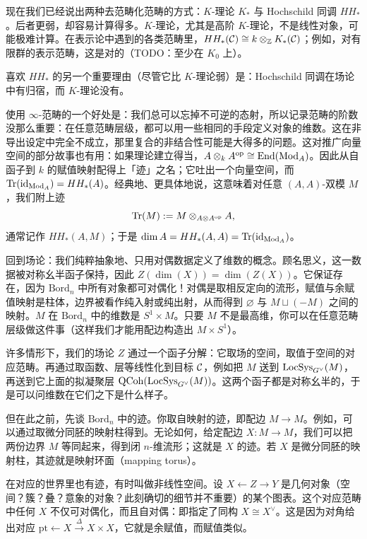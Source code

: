 
现在我们已经说出两种去范畴化范畴的方式：$K$-理论 $K_*$ 与 Hochschild 同调 $HH_*$。后者更弱，却容易计算得多。$K$-理论，尤其是高阶 $K$-理论，不是线性对象，可能极难计算。在表示论中遇到的各类范畴里，$HH_*(\mathcal{C})\cong k\otimes_{\mathbb{Z}} K_*(\mathcal{C})$；例如，对有限群的表示范畴，这是对的（TODO：至少在 $K_0$ 上）。

喜欢 $HH_*$ 的另一个重要理由（尽管它比 $K$-理论弱）是：Hochschild 同调在场论中有归宿，而 $K$-理论没有。

使用 $\infty$-范畴的一个好处是：我们总可以忘掉不可逆的态射，所以记录范畴的阶数没那么重要：在任意范畴层级，都可以用一些相同的手段定义对象的维数。这在非导出设定中完全不成立，那里复合的非结合性可能是大得多的问题。这对推广向量空间的部分故事也有用：如果理论建立得当，$A\otimes_k A^{\mathrm{op}}\cong\operatorname{End}(\mathrm{Mod}_A)$。因此从自函子到 $k$ 的赋值映射配得上「迹」之名；它吐出一个向量空间，而 $\operatorname{Tr}(\operatorname{id}_{\mathrm{Mod}_A})=HH_*(A)$。经典地、更具体地说，这意味着对任意 $(A,A)$-双模 $M$，我们附上迹
\[
\operatorname{Tr}(M):=M\otimes_{A\otimes A^{\mathrm{op}}}A,
\]
通常记作 $HH_*(A,M)$；于是 $\dim A=HH_*(A,A)=\operatorname{Tr}(\operatorname{id}_{\mathrm{Mod}_A})$。

回到场论：我们纯粹抽象地、只用对偶数据定义了维数的概念。顾名思义，这一数据被对称幺半函子保持，因此 $Z(\dim(X))=\dim(Z(X))$。它保证存在，因为 $\mathrm{Bord}_n$ 中所有对象都可对偶化！对偶是取相反定向的流形，赋值与余赋值映射是柱体，边界被看作纯入射或纯出射，从而得到 $\varnothing$ 与 $M\sqcup(-M)$ 之间的映射。$M$ 在 $\mathrm{Bord}_n$ 中的维数是 $S^1\times M$。只要 $M$ 不是最高维，你可以在任意范畴层级做这件事（这样我们才能用配边构造出 $M\times S^1$）。

许多情形下，我们的场论 $Z$ 通过一个函子分解：它取场的空间，取值于空间的对应范畴。再通过取函数、层等线性化到目标 $\mathcal{C}$，例如把 $M$ 送到 $\mathrm{LocSys}_{G^\vee}(M)$，再送到它上面的拟凝聚层 $\mathrm{QCoh}(\mathrm{LocSys}_{G^\vee}(M))$。这两个函子都是对称幺半的，于是可以问维数在它们之下是什么样子。

但在此之前，先谈 $\mathrm{Bord}_n$ 中的迹。你取自映射的迹，即配边 $M\to M$。例如，可以通过取微分同胚的映射柱得到。无论如何，给定配边 $X\colon M\to M$，我们可以把两份边界 $M$ 等同起来，得到闭 $n$-维流形；这就是 $X$ 的迹。若 $X$ 是微分同胚的映射柱，其迹就是映射环面（mapping torus）。

在对应的世界里也有迹，有时叫做非线性空间。设 $X\leftarrow Z\to Y$ 是几何对象（空间？簇？叠？意象的对象？此刻确切的细节并不重要）的某个图表。这个对应范畴中任何 $X$ 不仅可对偶化，而且自对偶：即指定了同构 $X\cong X^\vee$。这是因为对角给出对应 $\mathrm{pt}\leftarrow X\xrightarrow{\Delta}X\times X$，它就是余赋值，而赋值类似。


